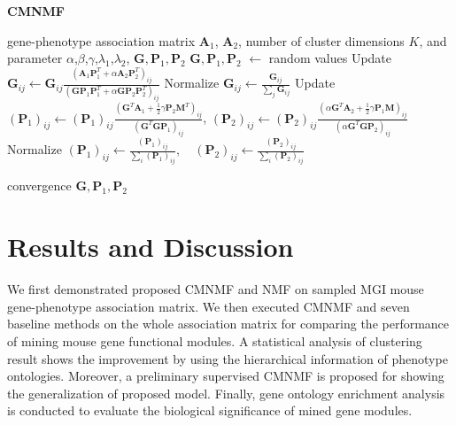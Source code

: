 \documentclass{bmcart}
\begin{document}
\begin{algorithm}[t]
\caption{\textbf{CMNMF}}\label{alg:CMNMF}
\renewcommand{\algorithmicrequire}{\textbf{Input:}}
\renewcommand{\algorithmicensure}{\textbf{Output:}}
\label{alg:pf}
\begin{algorithmic}[1]
\REQUIRE gene-phenotype association matrix $\bm{A}_1$, $\bm{A}_2$, number of cluster dimensions $K$, and parameter $\alpha$,$\beta$,$\gamma$,$\lambda_1$,$\lambda_2$,
\ENSURE {} ${\bm{G}}, {\bm{P}_1}, {\bm{P}_2}$
\STATE ${\bm{G}},{\bm{P}_1},{\bm{P}_2}$ $\leftarrow$ random values
\REPEAT
    \STATE Update $\bm{G}_{ij}\leftarrow \bm{G}_{ij}\frac{(\bm{A}_1\bm{P}_1^T+\alpha \bm{A}_2\bm{P}_2^T)_{ij}}{(\bm{G}\bm{P}_1\bm{P}_1^T+\alpha \bm{G}\bm{P}_2\bm{P}_2^T %
    )_{ij}}    $
    \STATE Normalize $\bm{G}_{ij}\leftarrow \frac{\bm{G}_{ij}}{\sum_{j}\bm{G}_{ij}}$
    \STATE Update $(\bm{P}_1)_{ij}\leftarrow (\bm{P}_1)_{ij}\frac{(\bm{G}^T\bm{A}_1+\frac{1}{2}\gamma \bm{P}_2\bm{M}^T)_{ij}}{(\bm{G}^T\bm{G}\bm{P}_1
    )_{ij}}$,
    $(\bm{P}_2)_{ij}\leftarrow (\bm{P}_2)_{ij}\frac{(\alpha \bm{G}^T\bm{A}_2+\frac{1}{2}\gamma \bm{P}_1\bm{M})_{ij}}
    {(\alpha \bm{G}^T\bm{G}\bm{P}_2
    )_{ij}}$
    \STATE Normalize $(\bm{P}_1)_{ij}\leftarrow \frac{(\bm{P}_1)_{ij}}{\sum_{i}(\bm{P}_1)_{ij}}, \quad
(\bm{P}_2)_{ij}\leftarrow \frac{(\bm{P}_2)_{ij}}{\sum_{i}(\bm{P}_2)_{ij}}$

\UNTIL convergence
\RETURN ${\bm{G}},{\bm{P}_1},{\bm{P}_2}$
\end{algorithmic}
\end{algorithm}

\section*{Results and Discussion}

We first demonstrated proposed CMNMF and NMF on sampled MGI mouse gene-phenotype association matrix. We then executed CMNMF and seven baseline methods on the whole association matrix for comparing the performance of mining mouse gene functional modules. A statistical analysis of clustering result shows the improvement by using the hierarchical information of phenotype ontologies. Moreover, a preliminary supervised CMNMF is proposed for showing the generalization of proposed model. Finally, gene ontology enrichment analysis is conducted to evaluate the biological significance of mined gene modules.
\end{document}
